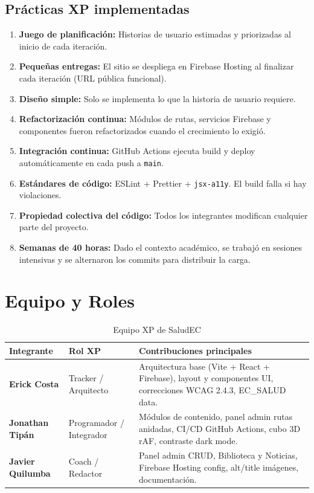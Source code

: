 \documentclass[12pt, a4paper]{article}
\begin{document}
\subsection{Prácticas XP implementadas}

\begin{enumerate}
  \item \textbf{Juego de planificación:} Historias de usuario estimadas y priorizadas al inicio de cada iteración.
  \item \textbf{Pequeñas entregas:} El sitio se despliega en Firebase Hosting al finalizar cada iteración (URL pública funcional).
  \item \textbf{Diseño simple:} Solo se implementa lo que la historia de usuario requiere.
  \item \textbf{Refactorización continua:} Módulos de rutas, servicios Firebase y componentes fueron refactorizados cuando el crecimiento lo exigió.
  \item \textbf{Integración continua:} GitHub Actions ejecuta build y deploy automáticamente en cada push a \texttt{main}.
  \item \textbf{Estándares de código:} ESLint + Prettier + \texttt{jsx-a11y}. El build falla si hay violaciones.
  \item \textbf{Propiedad colectiva del código:} Todos los integrantes modifican cualquier parte del proyecto.
  \item \textbf{Semanas de 40 horas:} Dado el contexto académico, se trabajó en sesiones intensivas y se alternaron los commits para distribuir la carga.
\end{enumerate}

\section{Equipo y Roles}

\begin{table}[H]
\centering
\caption{Equipo XP de SaludEC}
\begin{tabular}{@{}>{\bfseries}p{3.5cm} p{4.5cm} p{6cm}@{}}
\toprule
\rowcolor{violetxp!10}
\textbf{Integrante} & \textbf{Rol XP} & \textbf{Contribuciones principales} \\
\midrule
Erick Costa &
  Tracker / Arquitecto &
  Arquitectura base (Vite + React + Firebase), layout y componentes UI, correcciones WCAG 2.4.3, EC\_SALUD data. \\[4pt]
Jonathan Tipán &
  Programador / Integrador &
  Módulos de contenido, panel admin rutas anidadas, CI/CD GitHub Actions, cubo 3D rAF, contraste dark mode. \\[4pt]
Javier Quilumba &
  Coach / Redactor &
  Panel admin CRUD, Biblioteca y Noticias, Firebase Hosting config, alt/title imágenes, documentación. \\
\bottomrule
\end{tabular}
\end{table}
\end{document}
